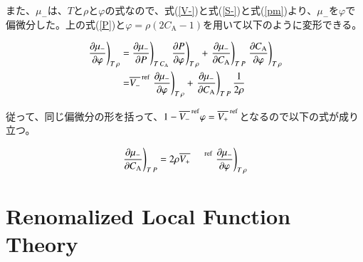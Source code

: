 \documentclass[a4paper,12pt, oneside, openany]{jsbook}
\begin{document}
また、$\mu_{-}$は、$T$と$\rho$と$\varphi$の式なので、式(\ref{V-})と式(\ref{S-})と式(\ref{pm})より、$\mu_{-}$を$\varphi$で偏微分した。上の式(\ref{P})と$\varphi=\rho(2C_{\mathrm{A}}-1)$を用いて以下のように変形できる。

\begin{equation}
  \begin{split}
     \left.\frac{\partial \mu_-}{\partial\varphi}\right)_{T\hspace{0.5mm}\rho}=&\left.\frac{\partial \mu_-}{\partial P}\right)_{T\hspace{0.5mm}C_{\mathrm{A}}}
  \left.\frac{\partial P}{\partial \varphi}\right)_{T\hspace{0.5mm}\rho}+\left.\frac{\partial \mu_-}{\partial C_{\mathrm{A}}}\right)_{T\hspace{0.5mm}P}\left.\frac{\partial C_{\mathrm{A}}}{\partial \varphi}\right)_{T\hspace{0.5mm}\rho}\\
  =&\overline{V_-}^{\mathrm{\hspace{0.5mm}ref}}\left.\frac{\partial \mu_-}{\partial \varphi}\right)_{T\hspace{0.5mm}\rho}+\left.\frac{\partial \mu_-}{\partial C_{\mathrm{A}}}\right)_{T\hspace{0.5mm}P}\frac{1}{2\rho}
  \end{split}
\end{equation}

\noindent 従って、同じ偏微分の形を括って、$1-\overline{V_{-}}^{\hspace{0.5mm}\mathrm{ref}}\varphi=\overline{V_{+}}^{\hspace{0.5mm}\mathrm{ref}}$となるので以下の式が成り立つ。

\begin{equation}\label{neturik}
  \left.\frac{\partial\mu_-}{\partial C_{\mathrm{A}}}\right)_{T\hspace{0.5mm}P}=2\rho\overline{V_+}^{\hspace{5mm}\mathrm{ref}}\left.\frac{\partial \mu_-}{\partial \varphi}\right)_{T\hspace{0.5mm}\rho}
\end{equation}






\chapter{Renomalized Local Function Theory}
\end{document}
